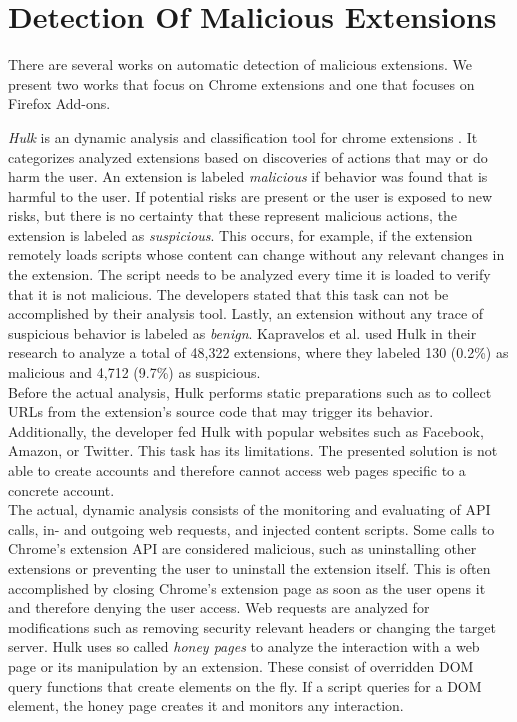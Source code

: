\section{Detection Of Malicious Extensions}
\label{sec:relatedWorks:detectionOfMaliciousExtensions} 
	
	There are several works on automatic detection of malicious extensions. We present two works that focus on Chrome extensions and one that focuses on Firefox Add-ons.
	
	\textit{Hulk} is an dynamic analysis and classification tool for chrome extensions \cite{184485}. It categorizes analyzed extensions based on discoveries of actions that may or do harm the user. An extension is labeled \textit{malicious} if behavior was found that is harmful to the user. If potential risks are present or the user is exposed to new risks, but there is no certainty that these represent malicious actions, the extension is labeled as \textit{suspicious}. This occurs, for example, if the extension remotely loads scripts whose content can change without any relevant changes in the extension. The script needs to be analyzed every time it is loaded to verify that it is not malicious. The developers stated that this task can not be accomplished by their analysis tool. Lastly, an extension without any trace of suspicious behavior is labeled as \textit{benign}.  Kapravelos et al. used Hulk in their research to analyze a total of 48,322 extensions, where they labeled 130 (0.2\%) as malicious and 4,712 (9.7\%) as suspicious. \\
	Before the actual analysis, Hulk performs static preparations such as to collect URLs from the extension's source code that may trigger its behavior. Additionally, the developer fed Hulk with popular websites such as Facebook, Amazon, or Twitter. This task has its limitations. The presented solution is not able to create accounts and therefore cannot access web pages specific to a concrete account. \\
	The actual, dynamic analysis consists of the monitoring and evaluating of API calls, in- and outgoing web requests, and injected content scripts. Some calls to Chrome's extension API are considered malicious, such as uninstalling other extensions or preventing the user to uninstall the extension itself. This is often accomplished by closing Chrome's extension page as soon as the user opens it and therefore denying the user access. Web requests are analyzed for modifications such as removing security relevant headers or changing the target server. Hulk uses so called \textit{honey pages} to analyze the interaction with a web page or its manipulation by an extension. These consist of overridden DOM query functions that create elements on the fly. If a script queries for a DOM element, the honey page creates it and monitors any interaction. 
	
